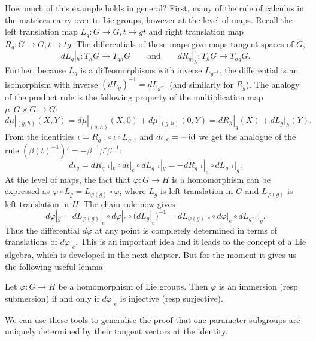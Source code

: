 How much of this example holds in general?
First, many of the rule of calculus in the matrices carry over to Lie groups, however at the level of maps.
Recall the left translation map $L_g : G \to G, t \mapsto gt$ and right translation map $R_g : G \to G, t \mapsto tg$.
The differentials of these maps give maps tangent spaces of $G$,
\[
dL_g|_h : T_hG \to T_{gh}G
\qquad\text{and}\qquad
dR_g|_h : T_hG \to T_{hg}G.
\]
Further, because $L_g$ is a diffeomorphisms with inverse $L_{g^{-1}}$, the differential is an isomorphism with inverse $(dL_g)^{-1} = dL_{g^{-1}}$ (and similarly for $R_g$).
The analogy of the product rule is the following property of the multiplication map $\mu : G \times G \to G$:
\[
d\mu|_{(g,h)}(X,Y)
= d\mu|_{(g,h)}(X,0) + d\mu|_{(g,h)}(0,Y)
= dR_h|_g(X) + dL_g|_h(Y).
\]
From the identities $\iota = R_{g^{-1}} \circ \iota \circ L_{g^{-1}}$ and $d\iota|_e = - \operatorname{id}$ we get the analogue of the rule $(\beta(t)^{-1})' = - \beta^{-1} \beta' \beta^{-1}$:
\[
d\iota_g 
= dR_{g^{-1}}|_e \circ d\iota|_e \circ dL_{g^{-1}}|_g 
= - dR_{g^{-1}}|_e \circ dL_{g^{-1}}|_g.
\]
At the level of maps, the fact that $\varphi : G \to H$ is a homomorphism can be expressed as $\varphi \circ L_g = L_{\varphi(g)} \circ \varphi$, where $L_g$ is left translation in $G$ and $L_{\varphi(g)}$ is left translation in $H$.
The chain rule now gives
\[
d\varphi|_g  
= dL_{\varphi(g)}|_e \circ d\varphi|_e \circ (dL_g|_e)^{-1}
= dL_{\varphi(g)}|_e \circ d\varphi|_e \circ dL_{g^{-1}}|_g.
\] 
Thus the differential $d\varphi$ at any point is completely determined  in terms of translations of $d\varphi|_e$.
This is an important idea and it leads to the concept of a Lie algebra, which is developed in the next chapter.
But for the moment it gives us the following useful lemma
\begin{lemma}
\label{lem:injective differential}
Let $\varphi : G \to H$ be a homomorphism of Lie groups.
Then $\varphi$ is an immersion (resp submersion) if and only if $d\varphi|_e$ is injective (resp surjective).
\end{lemma}

We can use these tools to generalise the proof that one parameter subgroups are uniquely determined by their tangent vectors at the identity.

